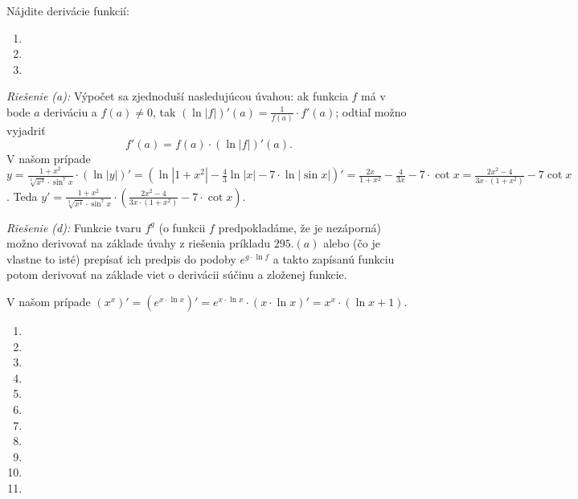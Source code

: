 Nájdite derivácie funkcií:

\begin{enumerate}[resume]
	\item {}
	\item {}
	\item {}
\end{enumerate}

\textit{Riešenie (a):}
Výpočet sa zjednoduší nasledujúcou úvahou: ak funkcia $f$ má v bode $a$ deriváciu a $f(a)\neq 0$, tak $(\ln |f|)'(a)=\frac{1}{f(a)}\cdot f'(a)$; odtiaľ možno vyjadriť
$$f'(a)=f(a)\cdot (\ln |f|)'(a).$$
V našom prípade $y=\frac{1+x^2}{\sqrt[3]{x^4}\cdot\sin^7 x}\cdot (\ln |y|)'=(\ln |1+x^2|-\frac{4}{3}\ln |x|-7\cdot\ln |\sin x|)'=\frac{2x}{1+x^2}-\frac{4}{3x}-7\cdot \cot x=\frac{2x^2-4}{3x\cdot (1+x^2)}-7\cot x$. Teda $y'=\frac{1+x^2}{\sqrt[3]{x^4}\cdot \sin^7 x}\cdot (\frac{2x^2-4}{3x\cdot (1+x^2)}-7\cdot\cot x)$.

\textit{Riešenie (d):}
Funkcie tvaru $f^g$ (o funkcii $f$ predpokladáme, že je nezáporná) možno derivovať na základe úvahy z riešenia príkladu $295.(a)$ alebo (čo je vlastne to isté) prepísať ich predpis do podoby $e^{g\cdot\ln f}$ a takto zapísanú funkciu potom derivovať na základe viet o derivácii súčinu a zloženej funkcie.

V našom prípade $(x^x)'=(e^{x\cdot\ln x})'=e^{x\cdot\ln x}\cdot(x\cdot\ln x)'=x^x\cdot(\ln x +1)$.
\begin{enumerate}[resume]
	\item {}
	\item {}
	\item {}
	\item {}
	\item {}
	\item {}
	\item {}
	\item {}
	\item {}
	\item {}
	\item {}
\end{enumerate}

